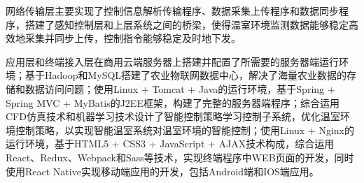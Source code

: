 网络传输层主要实现了控制信息解析传输程序、数据采集上传程序和数据同步程序，搭建了感知控制层和上层系统之间的桥梁，使得温室环境监测数据能够稳定高效地采集并同步上传，控制指令能够稳定及时地下发。

应用层和终端接入层在商用云端服务器上搭建并配置了所需要的服务器端运行环境；基于Hadoop和MySQL搭建了农业物联网数据中心，解决了海量农业数据的存储和数据访问问题；使用Linux + Tomcat + Java的运行环境，基于Spring + Spring MVC + MyBatis的J2EE框架，构建了完整的服务器端程序；综合运用CFD仿真技术和机器学习技术设计了智能控制策略学习控制子系统，优化温室环境控制策略，以实现智能温室系统对温室环境的智能控制；使用Linux + Nginx的运行环境，基于HTML5 + CSS3 + JavaScript + AJAX技术构成，综合运用React、Redux、Webpack和Sass等技术，实现终端程序中WEB页面的开发，同时使用React Native实现移动端应用的开发，包括Android端和IOS端应用。
